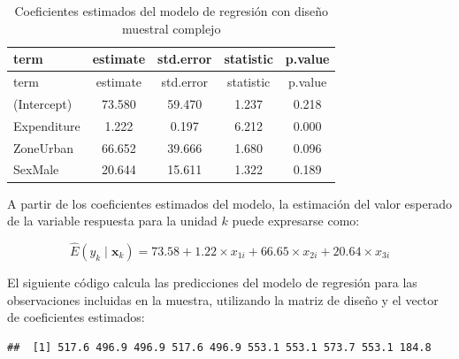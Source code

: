 \documentclass[
  spanish,
  12pt,
]{book}
\newenvironment{Shaded}{\begin{snugshade}}{\end{snugshade}}
\newcommand{\DecValTok}[1]{\textcolor[rgb]{0.00,0.00,0.81}{#1}}
\newcommand{\FunctionTok}[1]{\textcolor[rgb]{0.13,0.29,0.53}{\textbf{#1}}}
\newcommand{\NormalTok}[1]{#1}
\newcommand{\OtherTok}[1]{\textcolor[rgb]{0.56,0.35,0.01}{#1}}
\newcommand{\SpecialCharTok}[1]{\textcolor[rgb]{0.81,0.36,0.00}{\textbf{#1}}}
\begin{document}
\begin{longtable}[]{@{}lcccc@{}}
\caption{\label{tab:tab-coeficientes-modelo}Coeficientes estimados del modelo de regresión con diseño muestral complejo}\tabularnewline
\toprule\noalign{}
term & estimate & std.error & statistic & p.value \\
\midrule\noalign{}
\endfirsthead
\toprule\noalign{}
term & estimate & std.error & statistic & p.value \\
\midrule\noalign{}
\endhead
\bottomrule\noalign{}
\endlastfoot
(Intercept) & 73.580 & 59.470 & 1.237 & 0.218 \\
Expenditure & 1.222 & 0.197 & 6.212 & 0.000 \\
ZoneUrban & 66.652 & 39.666 & 1.680 & 0.096 \\
SexMale & 20.644 & 15.611 & 1.322 & 0.189 \\
\end{longtable}

A partir de los coeficientes estimados del modelo, la estimación del valor esperado de la variable respuesta para la unidad \(k\) puede expresarse como:

\[
\hat{E}(y_{k}\mid\mathbf{x}_{k})=73.58+1.22 \times x_{1i}+66.65 \times x_{2i}+20.64  \times  x_{3i}
\]

El siguiente código calcula las predicciones del modelo de regresión para las observaciones incluidas en la muestra, utilizando la matriz de diseño y el vector de coeficientes estimados:

\begin{Shaded}
\end{Shaded}

\begin{verbatim}
##  [1] 517.6 496.9 496.9 517.6 496.9 553.1 553.1 573.7 553.1 184.8
\end{verbatim}
\end{document}
